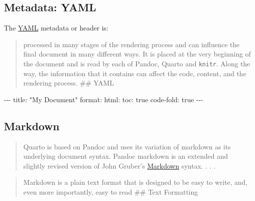 \documentclass[
  letterpaper,
  DIV=11,
  numbers=noendperiod]{scrartcl}
\newenvironment{Shaded}{\begin{snugshade}}{\end{snugshade}}
\newcommand{\AttributeTok}[1]{\textcolor[rgb]{0.40,0.45,0.13}{#1}}
\newcommand{\CharTok}[1]{\textcolor[rgb]{0.13,0.47,0.30}{#1}}
\newcommand{\FunctionTok}[1]{\textcolor[rgb]{0.28,0.35,0.67}{#1}}
\newcommand{\KeywordTok}[1]{\textcolor[rgb]{0.00,0.23,0.31}{#1}}
\newcommand{\PreprocessorTok}[1]{\textcolor[rgb]{0.68,0.00,0.00}{#1}}
\newcommand{\StringTok}[1]{\textcolor[rgb]{0.13,0.47,0.30}{#1}}
\begin{document}
\hypertarget{metadata-yaml}{%
\subsection{Metadata: YAML}\label{metadata-yaml}}

The \href{https://yaml.org/}{YAML} metadata or header is:

\begin{quote}
processed in many stages of the rendering process and can influence the
final document in many different ways. It is placed at the very
beginning of the document and is read by each of Pandoc, Quarto and
\texttt{knitr}. Along the way, the information that it contains can
affect the code, content, and the rendering process. \#\# YAML
\end{quote}

\begin{Shaded}
\begin{Highlighting}[]
\PreprocessorTok{{-}{-}{-}}
\FunctionTok{title}\KeywordTok{:}\AttributeTok{ }\StringTok{"My Document"}
\FunctionTok{format}\KeywordTok{:}\AttributeTok{ }
\AttributeTok{  }\FunctionTok{html}\KeywordTok{:}
\AttributeTok{    }\FunctionTok{toc}\KeywordTok{:}\AttributeTok{ }\CharTok{true}
\AttributeTok{    }\FunctionTok{code{-}fold}\KeywordTok{:}\AttributeTok{ }\CharTok{true}
\PreprocessorTok{{-}{-}{-}}
\end{Highlighting}
\end{Shaded}

\hypertarget{markdown}{%
\subsection{Markdown}\label{markdown}}

\begin{quote}
Quarto is based on Pandoc and uses its variation of markdown as its
underlying document syntax. Pandoc markdown is an extended and slightly
revised version of John Gruber's
\href{https://daringfireball.net/projects/markdown/}{Markdown} syntax. .
. .
\end{quote}

\begin{quote}
Markdown is a plain text format that is designed to be easy to write,
and, even more importantly, easy to read \#\# Text Formatting
\end{quote}
\end{document}
